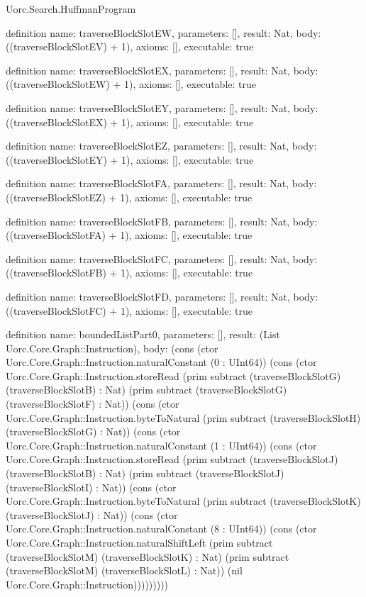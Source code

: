 \begin{lexlean}{Uorc.Search.HuffmanProgram}
\begin{semanticmodule}
definition{
  name: traverseBlockSlotEW,
  parameters: [],
  result: Nat,
  body: ((traverseBlockSlotEV) + 1),
  axioms: [],
  executable: true
}

definition{
  name: traverseBlockSlotEX,
  parameters: [],
  result: Nat,
  body: ((traverseBlockSlotEW) + 1),
  axioms: [],
  executable: true
}

definition{
  name: traverseBlockSlotEY,
  parameters: [],
  result: Nat,
  body: ((traverseBlockSlotEX) + 1),
  axioms: [],
  executable: true
}

definition{
  name: traverseBlockSlotEZ,
  parameters: [],
  result: Nat,
  body: ((traverseBlockSlotEY) + 1),
  axioms: [],
  executable: true
}

definition{
  name: traverseBlockSlotFA,
  parameters: [],
  result: Nat,
  body: ((traverseBlockSlotEZ) + 1),
  axioms: [],
  executable: true
}

definition{
  name: traverseBlockSlotFB,
  parameters: [],
  result: Nat,
  body: ((traverseBlockSlotFA) + 1),
  axioms: [],
  executable: true
}

definition{
  name: traverseBlockSlotFC,
  parameters: [],
  result: Nat,
  body: ((traverseBlockSlotFB) + 1),
  axioms: [],
  executable: true
}

definition{
  name: traverseBlockSlotFD,
  parameters: [],
  result: Nat,
  body: ((traverseBlockSlotFC) + 1),
  axioms: [],
  executable: true
}

definition{
  name: boundedListPart0,
  parameters: [],
  result: (List Uorc.Core.Graph::Instruction),
  body: (cons (ctor Uorc.Core.Graph::Instruction.naturalConstant (0 : UInt64)) (cons (ctor Uorc.Core.Graph::Instruction.storeRead (prim subtract (traverseBlockSlotG) (traverseBlockSlotB) : Nat) (prim subtract (traverseBlockSlotG) (traverseBlockSlotF) : Nat)) (cons (ctor Uorc.Core.Graph::Instruction.byteToNatural (prim subtract (traverseBlockSlotH) (traverseBlockSlotG) : Nat)) (cons (ctor Uorc.Core.Graph::Instruction.naturalConstant (1 : UInt64)) (cons (ctor Uorc.Core.Graph::Instruction.storeRead (prim subtract (traverseBlockSlotJ) (traverseBlockSlotB) : Nat) (prim subtract (traverseBlockSlotJ) (traverseBlockSlotI) : Nat)) (cons (ctor Uorc.Core.Graph::Instruction.byteToNatural (prim subtract (traverseBlockSlotK) (traverseBlockSlotJ) : Nat)) (cons (ctor Uorc.Core.Graph::Instruction.naturalConstant (8 : UInt64)) (cons (ctor Uorc.Core.Graph::Instruction.naturalShiftLeft (prim subtract (traverseBlockSlotM) (traverseBlockSlotK) : Nat) (prim subtract (traverseBlockSlotM) (traverseBlockSlotL) : Nat)) (nil Uorc.Core.Graph::Instruction)))))))))
}


\end{semanticmodule}
\end{lexlean}
